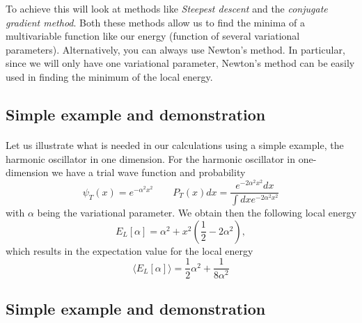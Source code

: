 \documentclass[%
twoside,                 %
final,                   %
10pt]{article}
\begin{document}
\noindent
To achieve this will look at methods like \emph{Steepest descent} and the \emph{conjugate gradient method}. Both these methods allow us to find
the minima of a multivariable  function like our energy (function of several variational parameters). 
Alternatively, you can always use Newton's method. In particular, since we will only have one variational parameter,
Newton's method can be easily used in finding the minimum of the local energy.



\subsection*{Simple example and demonstration}

\paragraph{}
Let us illustrate what is needed in our calculations using a simple example, the harmonic oscillator in one dimension.
For the harmonic oscillator in one-dimension we have a  trial wave function and probability
\begin{equation*}
\psi_T(x) = e^{-\alpha^2 x^2} \qquad P_T(x)dx = \frac{e^{-2\alpha^2 x^2}dx}{\int dx e^{-2\alpha^2 x^2}}
\end{equation*}
with $\alpha$ being the variational parameter. 
We obtain then the following local energy
\begin{equation*}
E_L[\alpha] = \alpha^2+x^2\left(\frac{1}{2}-2\alpha^2\right),
\end{equation*}
which results in the expectation value for the local energy
\begin{equation*}
\langle  E_L[\alpha]\rangle = \frac{1}{2}\alpha^2+\frac{1}{8\alpha^2}
\end{equation*}





\subsection*{Simple example and demonstration}

\end{document}
